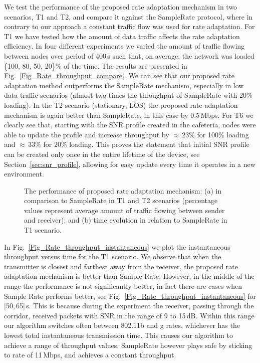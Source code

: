 \documentclass[11pt,draftclsnofoot,journal,onecolumn]{IEEEtran}
\begin{document}
We test the performance of the proposed rate adaptation mechanism in two scenarios, T1 and T2, and compare it against the SampleRate protocol, where in contrary to our approach a constant traffic flow was used for rate adaptation. For T1 we have tested how the amount of data traffic affects the rate adaptation efficiency. In four different experiments we varied the amount of traffic flowing between nodes over period of 400\,s such that, on average, the network was loaded \{100, 80, 50, 20\}\% of the time. The results are presented in Fig.~\ref{Fig_Rate_throughput_compare}. We can see that our proposed rate adaptation method outperforms the SampleRate mechanism, especially in low data traffic scenarios (almost two times the throughput of SampleRate with 20\% loading). In the T2 scenario (stationary, LOS) the proposed rate adaptation mechanism is again better than SampleRate, in this case by 0.5\,Mbps. For T6 we clearly see that, starting with the SNR profile created in the cafeteria, nodes were able to update the profile and increase throughput by $\approx$\,23\% for 100\% loading and $\approx$\,33\% for 20\% loading. This proves the statement that initial SNR profile can be created only once in the entire lifetime of the device, see Section~\ref{sec:snr_profile}, allowing for easy update every time it operates in a new environment.
\begin{figure}
\centering
{}
\caption{The performance of proposed rate adaptation mechanism: (a) in comparison to SampleRate in T1 and T2 scenarios (percentage values represent average amount of traffic flowing between sender and receiver); and (b) time evolution in relation to SampleRate in T1 scenario.}
\end{figure}

In Fig.~\ref{Fig_Rate_throughput_instantaneous} we plot the instantaneous throughput versus time for the T1 scenario. We observe that when the transmitter is closest and farthest away from the receiver, the proposed rate adaptation mechanism is better than Sample Rate. However, in the middle of the range the performance is not significantly better, in fact there are cases when Sample Rate performs better, see Fig.~\ref{Fig_Rate_throughput_instantaneous} for [50,\,65]\,s. This is because during the experiment the receiver, passing through the corridor, received packets with SNR in the range of 9 to 15\,dB.  Within this range our algorithm switches often between 802.11b and g rates, whichever has the lowest total instantaneous transmission time. This causes our algorithm to achieve a range of throughput values. SampleRate however plays safe by sticking to rate of 11\,Mbps, and achieves a constant throughput.
\end{document}

